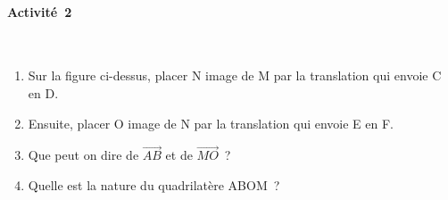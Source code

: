 \begin{minipage}{0.45\textwidth}
\thispagestyle{activite}

\paragraph{Activité~2} ~\\


\begin{center}
\end{center}

\begin{enumerate}
	\item Sur la figure ci-dessus, placer N image de M par la translation qui envoie C en D.
	\item Ensuite, placer O image de N par la translation qui envoie E en F.
	\item Que peut on dire de $\overrightarrow{AB}$ et de $\overrightarrow{MO}$~?
	\item Quelle est la nature du quadrilatère ABOM~?
\end{enumerate}

\end{minipage}